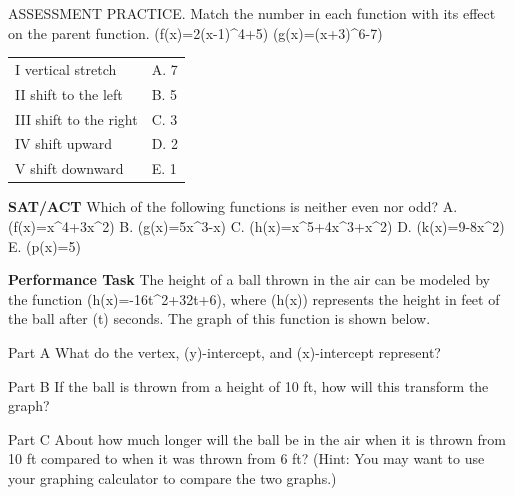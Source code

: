 \documentclass{article}
\newenvironment{practice}[2]{}{}        %
\newcommand{\answer}[1]{}               %
\newcommand{\placeholder}[2]{}          %
\newcommand{\te}[1]{}                   %
\begin{document}
\begin{practice}{25}{1}
ASSESSMENT PRACTICE. Match the number in each function with its effect on the parent function.
(f(x)=2(x-1)^4+5)
(g(x)=(x+3)^6-7)
\begin{tabular}{ll}
I vertical stretch & A. 7 \\
II shift to the left & B. 5 \\
III shift to the right & C. 3 \\
IV shift upward & D. 2 \\
V shift downward & E. 1 \\
\end{tabular}
\answer{I--D; II--C; III--E; IV--B; V--A}
\end{practice}
\begin{practice}{26}{1}
\textbf{SAT/ACT} Which of the following functions is neither even nor odd?
A. (f(x)=x^4+3x^2)
B. (g(x)=5x^3-x)
C. (h(x)=x^5+4x^3+x^2)
D. (k(x)=9-8x^2)
E. (p(x)=5)
\answer{C}
\end{practice}
\begin{practice}{27}{2}
\textbf{Performance Task} The height of a ball thrown in the air can be modeled by the function (h(x)=-16t^2+32t+6), where (h(x)) represents the height in feet of the ball after (t) seconds. The graph of this function is shown below.
\placeholder{graph}{Red downward parabola from (0,6) rising to (1,22), then down with arrow near (2.17,0). Horizontal axis time (seconds), x, labels0,1,2,3,4, grid0.5, window0 to5. Vertical axis height (feet), y, labels0,6,12,18,24, grid3, window0 to30.}
Part A What do the vertex, (y)-intercept, and (x)-intercept represent?
\answer{vertex: maximum altitude (in feet) reached by the ball; (y)-intercept: the height from which the ball is thrown; (x)-intercept: the time (in seconds) it took the ball to hit the ground}
Part B If the ball is thrown from a height of 10 ft, how will this transform the graph?
\answer{It will shift the graph up by 4 units, or 4 ft.}
Part C About how much longer will the ball be in the air when it is thrown from 10 ft compared to when it was thrown from 6 ft? (Hint: You may want to use your graphing calculator to compare the two graphs.)
\answer{0.102 s}
\te{Printed h(x) uses t as the time variable.}
\end{practice}
\end{document}
